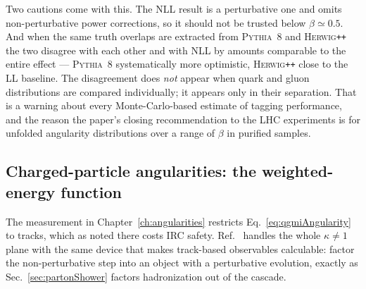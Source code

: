Two cautions come with this. The NLL result is a perturbative one and omits
non-perturbative power corrections, so it should not be trusted below
\(\beta\simeq0.5\). And when the same truth overlaps are extracted from
\textsc{Pythia}~8 and \textsc{Herwig}\texttt{++} the two disagree with each other and with NLL by amounts
comparable to the entire effect --- \textsc{Pythia}~8 systematically more optimistic, \textsc{Herwig}\texttt{++}
close to the LL baseline. The disagreement does \emph{not} appear when quark and
gluon distributions are compared individually; it appears only in their separation.
That is a warning about every Monte-Carlo-based estimate of tagging performance, and
the reason the paper's closing recommendation to the LHC experiments is for unfolded
angularity distributions over a range of \(\beta\) in purified samples.

\subsection{Charged-particle angularities: the weighted-energy function}
\label{subsec:qgmiUnsafe}

The measurement in Chapter~\ref{ch:angularities} restricts Eq.~\ref{eq:qgmiAngularity}
to tracks, which as noted there costs IRC safety. Ref.~\cite{Larkoski_2014} handles
the whole \(\kappa\neq1\) plane with the same device that makes track-based
observables calculable: factor the non-perturbative step into an object with a
perturbative evolution, exactly as Sec.~\ref{sec:partonShower} factors hadronization
out of the cascade.

